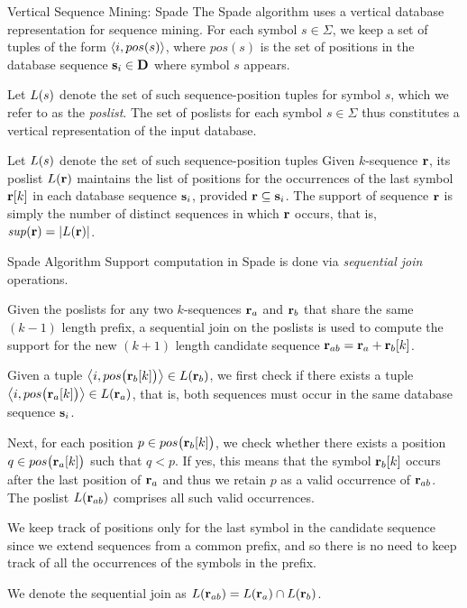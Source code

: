 \begin{frame}{Vertical Sequence Mining: Spade}
The Spade algorithm uses a vertical database representation for sequence
mining. For each symbol $s \in \Sigma$, we keep a
set of tuples of the form $\langle i, pos(s) \rangle$, where
$pos(s)$ is the set of positions in the database sequence
$\mathbf{s}_i \in \mathbf{D}$ where symbol $s$
appears. 

\medskip
Let ${\relax L}(s)$ denote the set of such sequence-position tuples
for symbol $s$,
which we refer to as the {\em poslist}.
The set of poslists for each symbol $s \in \Sigma$ thus constitutes a
vertical representation of the input database.

\medskip
Let ${\relax L}(s)$ denote the set of such sequence-position tuples
Given $k$-sequence
$\mathbf{r}$, its poslist ${\relax L}(\mathbf{r})$
maintains the list of positions for the occurrences
of the last symbol $\mathbf{r}[k]$ in each database sequence $\mathbf{s}_i$, provided
$\mathbf{r} \subseteq \mathbf{s}_i$. The support of sequence $\mathbf{r}$ is simply the
number of distinct sequences in which $\mathbf{r}$ occurs, that is,
$\mathit{sup}(\mathbf{r}) =
|{\relax L}(\mathbf{r})|$.

\end{frame}

\begin{frame}{Spade Algorithm}
Support computation in Spade is done via {\em sequential join}
operations.  

\medskip
Given the poslists for any two
$k$-sequences $\mathbf{r}_a$ and $\mathbf{r}_b$ that share the same $(k-1)$ length
pref\/{i}x, a sequential join on the poslists is used to
compute the support for the new $(k+1)$ length candidate sequence
$\mathbf{r}_{ab} = \mathbf{r}_a + \mathbf{r}_b[k]$.  

\medskip 
Given a tuple ${\big\langle i,pos\bigl(\mathbf{r}_b[k]\bigr) \big\rangle} \in
{\relax L}(\mathbf{r}_b)$, we f\/{i}rst check if there exists a tuple
${\big\langle i,pos\bigl(\mathbf{r}_a[k]\bigr) \big\rangle} \in {\relax L}(\mathbf{r}_a)$, that is, both
sequences must occur in the same database sequence $\mathbf{s}_i$. 

\smallskip
Next, for
each position $p \in pos\bigl(\mathbf{r}_b[k]\bigr)$, we check whether there
exists a position $q \in pos\bigl(\mathbf{r}_a[k]\bigr)$ such that $q < p$. If
yes, this means that the symbol $\mathbf{r}_b[k]$ occurs after the last
position of $\mathbf{r}_a$ and thus we retain $p$ as a valid occurrence of
$\mathbf{r}_{ab}$. The poslist ${\relax L}(\mathbf{r}_{ab})$ comprises all such valid
occurrences.  

\medskip
We keep track of positions only for the last
symbol in the candidate sequence since we extend sequences
from a common pref\/{i}x, and so there is no need to keep track of all the
occurrences of the symbols in the pref\/{i}x.  

\medskip
We denote the sequential
join as ${\relax L}(\mathbf{r}_{ab}) = {\relax L}(\mathbf{r}_a) \cap {\relax L}(\mathbf{r}_b)$.

\end{frame}


